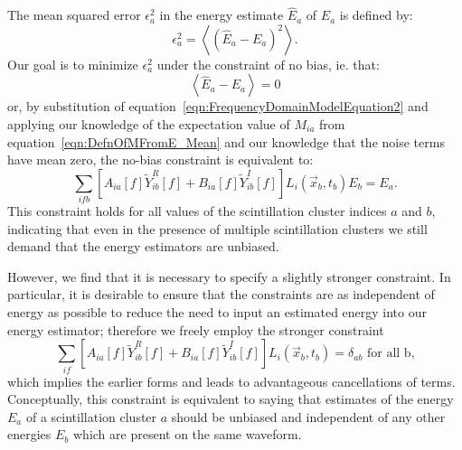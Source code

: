 The mean squared error $\epsilon^2_a$ in the energy estimate $\widehat{E}_a$ of $E_a$ is defined by:
\begin{equation}
\epsilon^2_a = \left< \left(\widehat{E}_a - E_a\right)^2\right>.
\end{equation}
Our goal is to minimize $\epsilon^2_a$ under the constraint of no bias, ie. that:
\begin{equation}\label{eqn:ConstraintForm1}
\left<\widehat{E}_a - E_a\right> = 0
\end{equation}
or, by substitution of equation~\ref{eqn:FrequencyDomainModelEquation2} and applying our knowledge of the expectation value of $M_{ia}$ from equation~\ref{eqn:DefnOfMFromE_Mean} and our knowledge that the noise terms have mean zero, the no-bias constraint is equivalent to:
\begin{equation}
\sum_{ifb}\left[A_{ia}[f] \widetilde{Y}_{ib}^R[f] + B_{ia}[f] \widetilde{Y}_{ib}^I[f]\right] L_i(\vec{x}_b,t_b) E_b = E_a.
\end{equation}
This constraint holds for all values of the scintillation cluster indices $a$ and $b$, indicating that even in the presence of multiple scintillation clusters we still demand that the energy estimators are unbiased.

However, we find that it is necessary to specify a slightly stronger constraint.  In particular, it is desirable to ensure that the constraints are as independent of energy as possible to reduce the need to input an estimated energy into our energy estimator; therefore we freely employ the stronger constraint
\begin{equation}
\sum_{if}\left[A_{ia}[f] \widetilde{Y}_{ib}^R[f] + B_{ia}[f] \widetilde{Y}_{ib}^I[f]\right] L_i(\vec{x}_b,t_b) = \delta_{ab} \text{~for all b,} \label{eqn:ConstraintForm3}
\end{equation}
which implies the earlier forms and leads to advantageous cancellations of terms.  Conceptually, this constraint is equivalent to saying that estimates of the energy $E_a$ of a scintillation cluster $a$ should be unbiased and independent of any other energies $E_b$ which are present on the same waveform.


